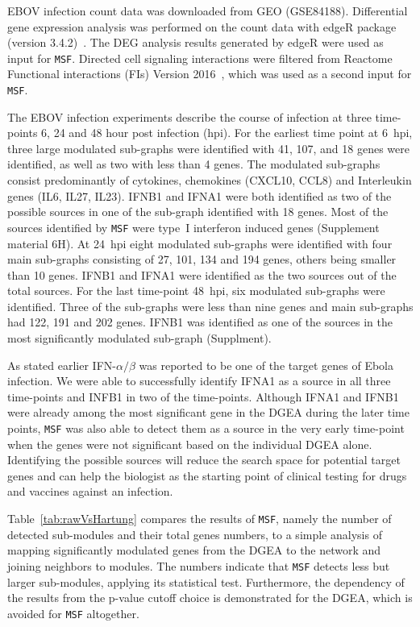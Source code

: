 \documentclass[10pt,a4paper,twocolumn]{article}
\begin{document}
EBOV infection count data was downloaded from GEO (GSE84188). Differential
gene expression analysis was performed on the count data with edgeR package
(version 3.4.2)~\cite{edgeR}. The DEG analysis results generated by edgeR
were used as input for \texttt{MSF}. Directed cell signaling interactions
were filtered from Reactome Functional interactions (FIs) Version
2016~\cite{Cytokegg}, which was used as a second input for \texttt{MSF}.

The EBOV infection experiments describe the course of infection at three
time-points 6, 24 and 48 hour post infection (hpi). For the earliest time
point at 6~hpi, three large modulated sub-graphs were identified with 41,
107, and 18 genes were identified, as well as two with less than 4 genes.
The modulated sub-graphs consist predominantly of cytokines, chemokines
(CXCL10, CCL8) and Interleukin genes (IL6, IL27, IL23).
IFNB1 and IFNA1 were both identified as two of the possible sources
in one of the sub-graph identified with 18 genes.
Most of the sources identified by \texttt{MSF} were
type~I interferon induced genes (Supplement material 6H).
At 24~hpi eight modulated sub-graphs were
identified with four main sub-graphs consisting
of 27, 101, 134 and 194 genes, others being smaller than 10 genes. IFNB1
and IFNA1 were identified as the two sources out of the total sources. For the last time-point 48~hpi,
six modulated sub-graphs were identified. Three of the sub-graphs were
less than nine genes and main sub-graphs had 122, 191 and 202 genes. IFNB1 was identified as one of the sources in
the most significantly modulated sub-graph (Supplment).

As stated earlier IFN-$\alpha / \beta$ was reported to be one of the target
genes of Ebola infection. We were able to successfully identify IFNA1 as a
source in all three time-points and INFB1 in two of the
time-points. Although IFNA1 and IFNB1 were already among the most
significant gene in the DGEA during the later time points, \texttt{MSF} was
also able to detect them as a source in the very early time-point when the
genes were not significant based on the individual DGEA alone. Identifying
the possible sources will reduce the search space for potential target
genes and can help the biologist as the starting point of clinical testing
for drugs and vaccines against an infection.

Table~\ref{tab:rawVsHartung} compares the results of \texttt{MSF}, namely
the number of detected sub-modules and their total genes numbers, to a
simple analysis of mapping significantly modulated genes from the DGEA to
the network and joining neighbors to modules. The numbers indicate that
\texttt{MSF} detects less but larger sub-modules, applying its statistical
test.  Furthermore, the dependency of the results from the p-value cutoff
choice is demonstrated for the DGEA, which is avoided for \texttt{MSF}
altogether.
\end{document}
